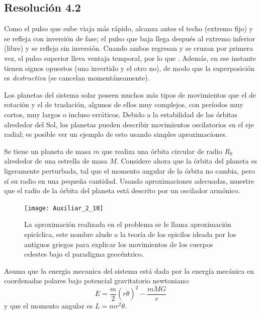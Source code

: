 \documentclass[
  11pt,
  letterpaper,
   addpoints,
  ]{exam}
\begin{document}
\begin{questions}
\begin{solution}
\subsection*{Resolución 4.2}
Como el pulso que sube viaja más rápido, alcanza antes el techo (extremo fijo) y se refleja con inversión de fase; el pulso que baja llega después al extremo inferior (libre) y se refleja sin inversión. Cuando ambos regresan y se cruzan por primera vez, el pulso superior lleva ventaja temporal, por lo que
. Además, en ese instante tienen signos opuestos (uno invertido y el otro no), de modo que la superposición es \emph{destructiva} (se cancelan momentáneamente).
\end{solution}
\question Los planetas del sistema solar poseen muchos más tipos de movimientos que el de rotación y el de traslación, algunos de ellos muy complejos, con períodos muy cortos, muy largos o incluso erráticos. Debido a la estabilidad de las órbitas alrededor del Sol, los planetas pueden describir movimientos oscilatorios en el eje radial; es posible ver un ejemplo de esto usando simples aproximaciones.

Se tiene un planeta de masa $m$ que realiza una órbita circular de radio $R_0$ alrededor de una estrella de masa $M$. Considere ahora que la órbita del planeta es ligeramente perturbada, tal que el momento angular de la órbita no cambia, pero sí su radio en una pequeña cantidad. Usando aproximaciones adecuadas, muestre que el radio de la órbita del planeta está descrito por un oscilador armónico.


\begin{figure}[H]
  \centering
  \texttt{[image: Auxiliar\_2\_10]}
  \caption{La aproximación realizada en el problema se le llama aproximación epicíclica, este nombre alude a la teoría de los epicilos ideada por los antiguos griegos para explicar los movimientos de los cuerpos celestes bajo el paradigma geocéntrico.}
  \label{fig:epiciclica}
\end{figure}

Asuma que la energia mecanica del sistema está dada por la energía mecánica en coordenadas polares bajo potencial gravitatorio newtoniano:
\begin{equation}
E= \frac{m}{2}\left(r\dot{\theta}\right)^{2} - \frac{mMG}{r}
\end{equation}
y que el momento angular es $L=m r^{2}\dot\theta$.

\begin{solution}

\end{solution}
\end{questions}
\end{document}
